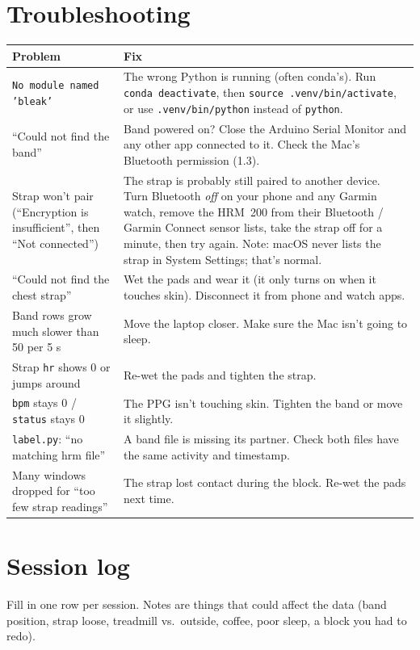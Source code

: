 \documentclass[11pt]{article}
\begin{document}
\section{Troubleshooting}
\renewcommand{\arraystretch}{1.3}
\begin{tabular}{@{}>{\raggedright\arraybackslash}p{2.3in} >{\raggedright\arraybackslash}p{4.1in}@{}}
\toprule
\textbf{Problem} & \textbf{Fix} \\
\midrule
\texttt{No module named 'bleak'} & The wrong Python is running (often conda's). Run \texttt{conda deactivate}, then \texttt{source .venv/bin/activate}, or use \texttt{.venv/bin/python} instead of \texttt{python}. \\
``Could not find the band'' & Band powered on? Close the Arduino Serial Monitor and any other app connected to it. Check the Mac's Bluetooth permission (1.3). \\
Strap won't pair (``Encryption is insufficient'', then ``Not connected'') & The strap is probably still paired to another device. Turn Bluetooth \emph{off} on your phone and any Garmin watch, remove the HRM~200 from their Bluetooth / Garmin Connect sensor lists, take the strap off for a minute, then try again. Note: macOS never lists the strap in System Settings; that's normal. \\
``Could not find the chest strap'' & Wet the pads and wear it (it only turns on when it touches skin). Disconnect it from phone and watch apps. \\
Band rows grow much slower than 50 per 5 s & Move the laptop closer. Make sure the Mac isn't going to sleep. \\
Strap \texttt{hr} shows 0 or jumps around & Re-wet the pads and tighten the strap. \\
\texttt{bpm} stays 0 / \texttt{status} stays 0 & The PPG isn't touching skin. Tighten the band or move it slightly. \\
\texttt{label.py}: ``no matching hrm file'' & A band file is missing its partner. Check both files have the same activity and timestamp. \\
Many windows dropped for ``too few strap readings'' & The strap lost contact during the block. Re-wet the pads next time. \\
\bottomrule
\end{tabular}

\section{Session log}
Fill in one row per session. Notes are things that could affect the data (band position, strap loose,
treadmill vs.\ outside, coffee, poor sleep, a block you had to redo).
\end{document}
